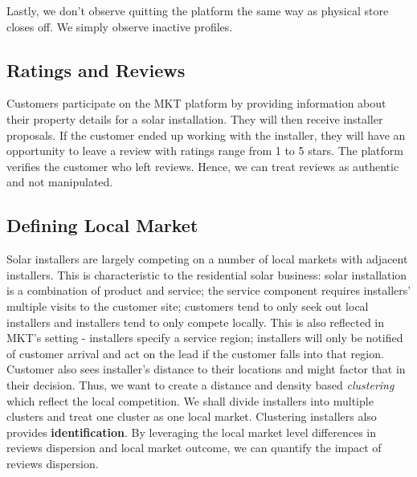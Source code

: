 \documentclass[msom,blindrev]{informs3}
\begin{document}
Lastly, we don't observe quitting the platform the same way as physical store closes off. We simply observe inactive profiles.


\subsection{Ratings and Reviews}
Customers participate on the MKT platform by providing information about their property details for a solar installation. They will then receive installer proposals. If the customer ended up working with the installer, they will have an opportunity to leave a review with ratings range from 1 to 5 stars. The platform verifies the customer who left reviews. Hence, we can treat reviews as authentic and not manipulated.

\subsection{Defining Local Market}
\label{defining_local_market}
Solar installers are largely competing on a number of local markets with adjacent installers.  This is characteristic to the residential solar business: solar installation is a combination of product and service; the service component requires installers' multiple visits to the customer site;  customers tend to only seek out local installers and installers tend to only compete locally. This is also reflected in MKT's setting - installers specify a service region; installers will only be notified of customer arrival and act on the lead if the customer falls into that region. Customer also sees installer's distance to their locations and might factor that in their decision. Thus, we want to create a distance and density based \textit{clustering} which reflect the local competition. We shall divide installers into multiple clusters and treat one cluster as one local market. Clustering installers also provides \textbf{identification}. By leveraging the local market level differences in reviews dispersion and local market outcome, we can quantify the impact of reviews dispersion. \\
\end{document}
